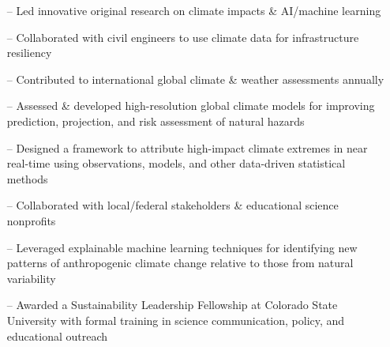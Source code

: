 \documentclass[10pt,letterpaper]{altacv} %
\begin{document}
\begin{itemize}
    \setlength{\itemindent}{0.5em}
    \item[--] \small{Led innovative original research on climate impacts \& AI\slash machine learning}
    \item[--] \small{Collaborated with civil engineers to use climate data for infrastructure resiliency}
    \item[--] \small{Contributed to international global climate \& weather assessments annually}
    \item[--] \small{Assessed \& developed high-resolution global climate models for improving prediction, projection, and risk assessment of natural hazards}
\end{itemize}
\medskip


\begin{itemize}
    \setlength{\itemindent}{0.5em}
    \item[--]   \small{Designed a framework to attribute high-impact climate extremes in near real-time using observations, models, and other data-driven statistical methods}
     \item[--] \small{Collaborated with local\slash federal stakeholders \& educational science nonprofits}
\end{itemize}
\medskip

\begin{itemize}
    \setlength{\itemindent}{0.5em}
    \item[--]   \small{Leveraged explainable machine learning techniques for identifying new patterns of anthropogenic climate change relative to those from natural variability}
    \item[--]    \small{Awarded a Sustainability Leadership Fellowship at Colorado State University with formal training in science communication, policy, and educational outreach}
\end{itemize}
\medskip
\end{document}
